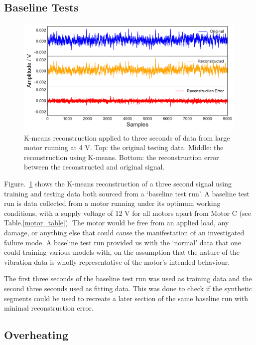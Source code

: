 \subsection{Baseline Tests}

\begin{figure}[t]
    \includegraphics[width=1.0\textwidth]{fig/kmeans_large_4Vnowater.pdf}
    \caption[K-means Large Motor Reconstruction No Water]{K-means reconstruction applied to three seconds of data from large motor running at 4 V. Top: the original testing data. Middle: the reconstruction using K-means. Bottom: the reconstruction error between the reconstructed and original signal.}
    \label{fig:kmeans_large4V}
\end{figure}

Figure.~\ref{fig:kmeans_large4V} shows the K-means reconstruction of a three second signal using training and testing data both sourced from a `baseline test run'. A baseline test run is data collected from a motor running under its optimum working conditions, with a supply voltage of 12 V for all motors apart from Motor C (see Table.\ref{motor_table}). The motor would be free from an applied load, any damage, or anything else that could cause the manifestation of an investigated failure mode. A baseline test run provided us with the `normal' data that one could training various models with, on the assumption that the nature of the vibration data is wholly representative of the motor's intended behaviour.

The first three seconds of the baseline test run was used as training data and the second three seconds used as fitting data. This was done to check if the synthetic segments could be used to recreate a later section of the same baseline run with minimal reconstruction error. 

\subsection{Overheating}

